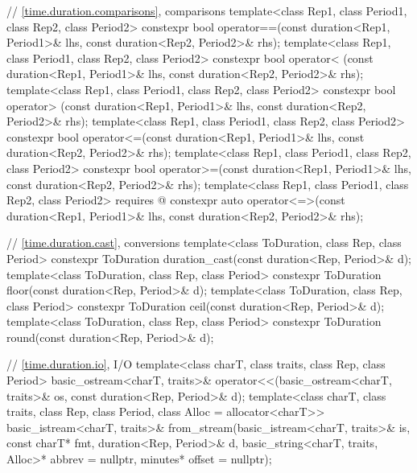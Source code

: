 \begin{codeblock}
{  // \ref{time.duration.comparisons},  comparisons
  template<class Rep1, class Period1, class Rep2, class Period2>
    constexpr bool operator==(const duration<Rep1, Period1>& lhs,
                              const duration<Rep2, Period2>& rhs);
  template<class Rep1, class Period1, class Rep2, class Period2>
    constexpr bool operator< (const duration<Rep1, Period1>& lhs,
                              const duration<Rep2, Period2>& rhs);
  template<class Rep1, class Period1, class Rep2, class Period2>
    constexpr bool operator> (const duration<Rep1, Period1>& lhs,
                              const duration<Rep2, Period2>& rhs);
  template<class Rep1, class Period1, class Rep2, class Period2>
    constexpr bool operator<=(const duration<Rep1, Period1>& lhs,
                              const duration<Rep2, Period2>& rhs);
  template<class Rep1, class Period1, class Rep2, class Period2>
    constexpr bool operator>=(const duration<Rep1, Period1>& lhs,
                              const duration<Rep2, Period2>& rhs);
  template<class Rep1, class Period1, class Rep2, class Period2>
    requires @\seebelow@
    constexpr auto operator<=>(const duration<Rep1, Period1>& lhs,
                               const duration<Rep2, Period2>& rhs);

  // \ref{time.duration.cast}, conversions
  template<class ToDuration, class Rep, class Period>
    constexpr ToDuration duration_cast(const duration<Rep, Period>& d);
  template<class ToDuration, class Rep, class Period>
    constexpr ToDuration floor(const duration<Rep, Period>& d);
  template<class ToDuration, class Rep, class Period>
    constexpr ToDuration ceil(const duration<Rep, Period>& d);
  template<class ToDuration, class Rep, class Period>
    constexpr ToDuration round(const duration<Rep, Period>& d);

  // \ref{time.duration.io},  I/O
  template<class charT, class traits, class Rep, class Period>
    basic_ostream<charT, traits>&
      operator<<(basic_ostream<charT, traits>& os,
                 const duration<Rep, Period>& d);
  template<class charT, class traits, class Rep, class Period, class Alloc = allocator<charT>>
    basic_istream<charT, traits>&
      from_stream(basic_istream<charT, traits>& is, const charT* fmt,
                  duration<Rep, Period>& d,
                  basic_string<charT, traits, Alloc>* abbrev = nullptr,
                  minutes* offset = nullptr);

}
\end{codeblock}
